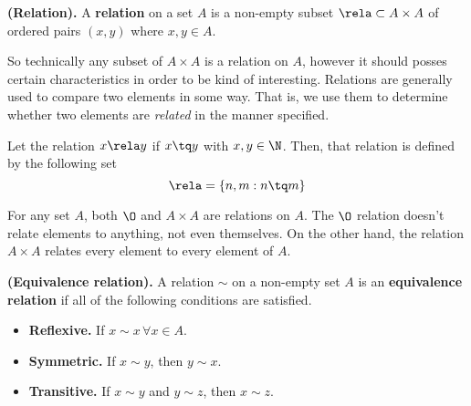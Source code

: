 
\begin{definition}
    \textbf{(Relation).} A \textbf{relation} on a set $A$ is a non-empty subset $\rela\subset A\times A$ of ordered pairs $\left( x, y \right) $ where $x, y\in A$. 
\end{definition}

So technically any subset of $A\times A$ is a relation on $A$, however it should posses certain characteristics in order to be kind of interesting. Relations are generally used to compare two elements in some way. That is, we use them to determine whether two elements are \textit{related} in the manner specified.

\begin{example}[]
   Let the relation $x\rela y$ if $x\tq y$ with $x, y\in\N$. Then, that relation is defined by the following set
   \begin{equation}
       \rela = \{n, m : n\tq m\} 
   \end{equation}
\end{example}
\begin{remark}
    For any set $A$, both $\O$ and $A\times A$ are relations on $A$. The $\O$ relation doesn't relate elements to anything, not even themselves. On the other hand, the relation $A\times A$ relates every element to every element of $A$.
\end{remark}

\begin{definition}
    \textbf{(Equivalence relation).} A relation $\sim$ on a non-empty set $A$ is an \textbf{equivalence relation} if all of the following conditions are satisfied.
    \begin{itemize}
        \item\textbf{Reflexive.} If $x\sim x\, \forall x\in A$.
        \item\textbf{Symmetric.} If $x\sim y$, then $y\sim x$.
        \item\textbf{Transitive.} If $x\sim y$ and $y\sim z$, then $x\sim z$.
    \end{itemize}
\end{definition}

